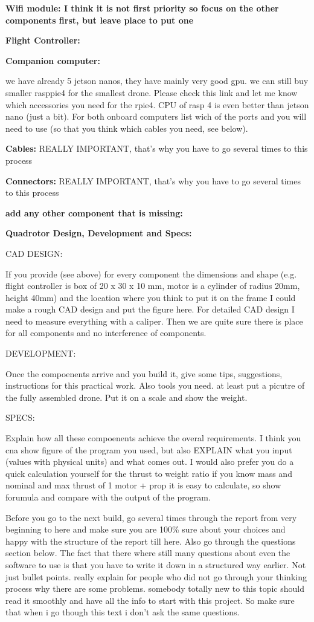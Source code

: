 \textbf{Wifi module: I think it is not first priority so focus on the other components first, but leave place to put one}

\textbf{Flight Controller:}

\textbf{Companion computer:}

we have already 5 jetson nanos, they have mainly very good gpu. we can still buy smaller rasppie4 for the smallest drone. Please check this link \cite{rpi_products} and let me know which accessories you need for the rpie4. CPU of rasp 4 is even better than jetson nano (just a bit). For both onboard computers list wich of the ports and you will need to use (so that you think which cables you need, see below).

\textbf{Cables:} REALLY IMPORTANT, that's why you have to go several times to this process

\textbf{Connectors:} REALLY IMPORTANT, that's why you have to go several times to this process

\textbf{add any other component that is missing:}


\textbf{Quadrotor Design, Development and Specs:}

CAD DESIGN:

If you provide (see above) for every component the dimensions and shape (e.g. flight controller is box of 20 x 30 x 10 mm, motor is a cylinder of radius 20mm, height 40mm) and the location where you think to put it on the frame I could make a rough CAD design and put the figure here. For detailed CAD design I need to measure everything with a caliper. Then we are quite sure there is place for all components and no interference of components.


DEVELOPMENT:

Once the compoenents arrive and you build it, give some tips, suggestions, instructions for this practical work. Also tools you need. at least put a picutre of the fully assembled drone. Put it on a scale and show the weight.

SPECS:

Explain how all these compoenents achieve the overal requirements. I think you cna show figure of the program you used, but also EXPLAIN what you input (values with physical units) and what comes out. I would also prefer you do a quick calculation yourself for the thrust to weight ratio if you know mass and nominal and max thrust of 1 motor + prop it is easy to calculate, so show forumula and compare with the output of the program.


Before you go to the next build, go several times through the report from very beginning to here and make sure you are 100\% sure about your choices and happy with the structure of the report till here. Also go through the questions section below. The fact that there where still many questions about even the software to use is that you have to write it down in a structured way earlier. Not just bullet points. really explain for people who did not go through your thinking process why there are some problems. somebody totally new to this topic should read it smoothly and have all the info to start with this project. So make sure that when i go though this text i don't ask the same questions.


